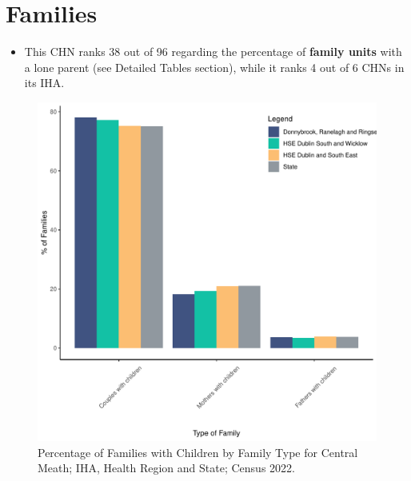 \documentclass{article}
\begin{document}
\section{Families}\label{sect:Fam}
\begin{itemize}
\item This CHN ranks  38 out of 96 regarding the percentage of \textbf{family units} with a lone parent (see Detailed Tables section), while it ranks   4 out of 6 CHNs in its IHA.
\end{itemize}
\begin{figure}[H]
	\centering
	\includegraphics[width = 150mm]{../figures/FamED.pdf}
	\caption{Percentage of Families with Children by Family Type for Central Meath; IHA, Health Region and State; Census 2022.}
	\label{fig:vbnv}
	\end{figure}
	
\end{document}
